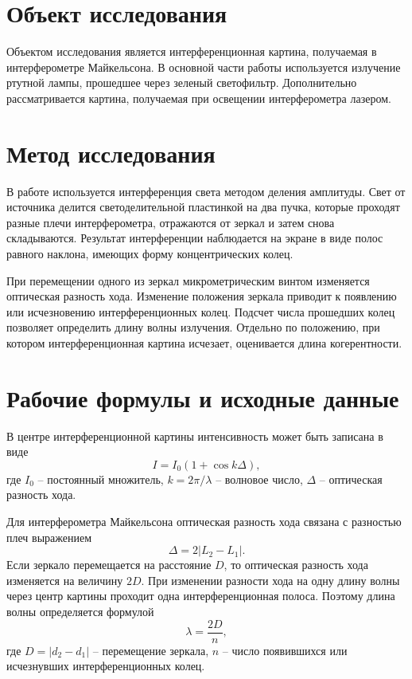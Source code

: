 \documentclass[12pt,a4paper]{article}
\begin{document}
\section{Объект исследования}

Объектом исследования является интерференционная картина, получаемая в интерферометре Майкельсона. В основной части работы используется излучение ртутной лампы, прошедшее через зеленый светофильтр. Дополнительно рассматривается картина, получаемая при освещении интерферометра лазером.

\section{Метод исследования}

В работе используется интерференция света методом деления амплитуды. Свет от источника делится светоделительной пластинкой на два пучка, которые проходят разные плечи интерферометра, отражаются от зеркал и затем снова складываются. Результат интерференции наблюдается на экране в виде полос равного наклона, имеющих форму концентрических колец.

При перемещении одного из зеркал микрометрическим винтом изменяется оптическая разность хода. Изменение положения зеркала приводит к появлению или исчезновению интерференционных колец. Подсчет числа прошедших колец позволяет определить длину волны излучения. Отдельно по положению, при котором интерференционная картина исчезает, оценивается длина когерентности.

\section{Рабочие формулы и исходные данные}

В центре интерференционной картины интенсивность может быть записана в виде
\begin{equation}
    I = I_0(1 + \cos k\Delta),
\end{equation}
где $I_0$ -- постоянный множитель, $k = 2\pi/\lambda$ -- волновое число, $\Delta$ -- оптическая разность хода.

Для интерферометра Майкельсона оптическая разность хода связана с разностью плеч выражением
\begin{equation}
    \Delta = 2|L_2 - L_1|.
\end{equation}
Если зеркало перемещается на расстояние $D$, то оптическая разность хода изменяется на величину $2D$. При изменении разности хода на одну длину волны через центр картины проходит одна интерференционная полоса. Поэтому длина волны определяется формулой
\begin{equation}
    \lambda = \frac{2D}{n},
    \label{eq:lambda}
\end{equation}
где $D = |d_2-d_1|$ -- перемещение зеркала, $n$ -- число появившихся или исчезнувших интерференционных колец.
\end{document}
